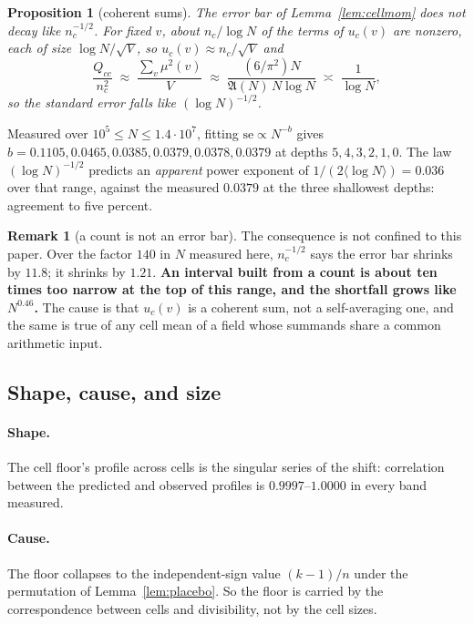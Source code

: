 \documentclass[11pt,a4paper]{article}
\theoremstyle{plain}
\newtheorem{proposition}[theorem]{Proposition}
\theoremstyle{definition}
\newtheorem{remark}[theorem]{Remark}
\newcommand{\AAA}{\mathfrak{A}}
\begin{document}
\begin{proposition}[coherent sums]\label{prop:coh}
The error bar of Lemma~\ref{lem:cellmom} does \emph{not} decay like
$n_c^{-1/2}$. For fixed $v$, about $n_c/\log N$ of the terms of
$u_c(v)$ are nonzero, each of size $\log N/\sqrt V$, so
$u_c(v)\approx n_c/\sqrt V$ and
\[
  \frac{Q_{cc}}{n_c^2}
  \;\approx\; \frac{\sum_v\mu^2(v)}{V}
  \;\approx\; \frac{(6/\pi^2)N}{\AAA(N)\,N\log N}
  \;\asymp\; \frac{1}{\log N},
\]
so the standard error falls like $(\log N)^{-1/2}$.
\end{proposition}

Measured over $10^5 \le N \le 1.4\cdot10^7$, fitting
$\mathrm{se}\propto N^{-b}$ gives $b = 0.1105, 0.0465, 0.0385,
0.0379, 0.0378, 0.0379$ at depths $5,4,3,2,1,0$. The law
$(\log N)^{-1/2}$ predicts an \emph{apparent} power exponent of
$1/(2\langle\log N\rangle) = 0.036$ over that range, against the
measured $0.0379$ at the three shallowest depths: agreement to five
percent.

\begin{remark}[a count is not an error bar]
The consequence is not confined to this paper. Over the factor $140$ in
$N$ measured here, $n_c^{-1/2}$ says the error bar shrinks by $11.8$;
it shrinks by $1.21$. \textbf{An interval built from a count is about
ten times too narrow at the top of this range, and the shortfall grows
like $N^{0.46}$.} The cause is that $u_c(v)$ is a coherent sum, not a
self-averaging one, and the same is true of any cell mean of a field
whose summands share a common arithmetic input.
\end{remark}

\subsection{Shape, cause, and size}

\paragraph{Shape.} The cell floor's profile across cells is the
singular series of the shift: correlation between the predicted and
observed profiles is $0.9997$--$1.0000$ in every band measured.

\paragraph{Cause.} The floor collapses to the independent-sign value
$(k-1)/n$ under the permutation of Lemma~\ref{lem:placebo}. So the
floor is carried by the correspondence between cells and divisibility,
not by the cell sizes.
\end{document}
